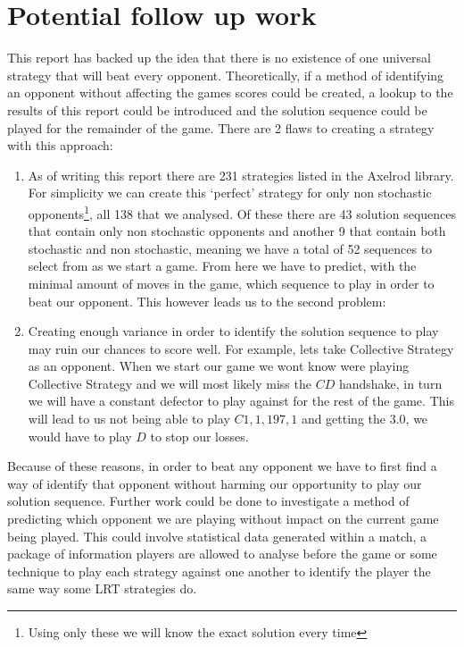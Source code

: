 \section{Potential follow up work}\label{sec:follow_up}
This report has backed up the idea that there is no existence of one universal strategy that will beat every opponent.
Theoretically, if a method of identifying an opponent without affecting the games scores could be created, a lookup to the results of this report could be introduced and the solution sequence could be played for the remainder of the game.
There are 2 flaws to creating a strategy with this approach:
\begin{enumerate}
    \item {As of writing this report there are 231 strategies listed in the Axelrod library.
    For simplicity we can create this `perfect' strategy for only non stochastic opponents\footnote{Using only these we will know the exact solution every time}, all 138 that we analysed.
    Of these there are 43 solution sequences that contain only non stochastic opponents and another 9 that contain both stochastic and non stochastic, meaning we have a total of 52 sequences to select from as we start a game.
    From here we have to predict, with the minimal amount of moves in the game, which sequence to play in order to beat our opponent.
    This however leads us to the second problem:}

    \item {Creating enough variance in order to identify the solution sequence to play may  ruin our chances to score well.
    For example, lets take Collective Strategy as an opponent.
    When we start our game we wont know were playing Collective Strategy and we will most likely miss the $CD$ handshake, in turn we will have a constant defector to play against for the rest of the game.
    This will lead to us not being able to play $C1,1,197,1$ and getting the $3.0$, we would have to play $D$ to stop our losses.}
\end{enumerate}

Because of these reasons, in order to beat any opponent we have to first find a way of identify that opponent without harming our opportunity to play our solution sequence. 
Further work could be done to investigate a method of predicting which opponent we are playing without impact on the current game being played.
This could involve statistical data generated within a match, a package of information players are allowed to analyse before the game or some technique to play each strategy against one another to identify the player the same way some LRT strategies do.

